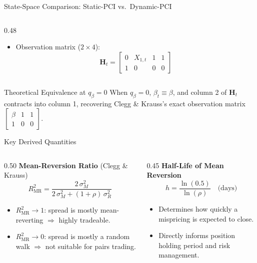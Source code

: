 \documentclass[10pt, aspectratio=169]{beamer}
\begin{document}
\begin{frame}{State-Space Comparison: Static-PCI vs.\ Dynamic-PCI}
\begin{columns}[T]
\begin{column}{0.48\textwidth}
\begin{itemize}
\[          \]
        \item Observation matrix ($2 \times 4$):
          \[
            \bm{H}_t = \begin{bmatrix}0 & X_{1,t} & 1 & 1\\ 1 & 0 & 0 & 0\end{bmatrix}
          \]
      \end{itemize}
    \end{column}
  \end{columns}
  \vspace{6pt}
  \begin{block}{Theoretical Equivalence at $q_\beta = 0$}
    When $q_\beta = 0$, $\beta_t \equiv \beta$, and column 2 of $\bm{H}_t$ contracts into column 1,
    recovering Clegg \& Krauss's exact observation matrix $\begin{bmatrix}\beta & 1 & 1\\ 1 & 0 & 0\end{bmatrix}$.
  \end{block}
\end{frame}

\begin{frame}{Key Derived Quantities}
  \begin{columns}[T]
    \begin{column}{0.50\textwidth}
      \textbf{Mean-Reversion Ratio} (Clegg \& Krauss)
      \[
        R^2_{\text{MR}} = \frac{2\,\sigma_M^2}{2\,\sigma_M^2 + (1+\rho)\,\sigma_R^2}
      \]
      \begin{itemize}
        \item $R^2_{\text{MR}} \to 1$: spread is mostly mean-reverting
              $\Rightarrow$ highly tradeable.
        \item $R^2_{\text{MR}} \to 0$: spread is mostly a random walk
              $\Rightarrow$ not suitable for pairs trading.
      \end{itemize}
    \end{column}
    \begin{column}{0.45\textwidth}
      \textbf{Half-Life of Mean Reversion}
      \[
        h = \frac{\ln(0.5)}{\ln(\rho)} \quad \text{(days)}
      \]
      \begin{itemize}
        \item Determines how quickly a mispricing is expected to close.
        \item Directly informs position holding period and risk management.
      \end{itemize}
    \end{column}
  \end{columns}
\end{frame}
\end{document}
